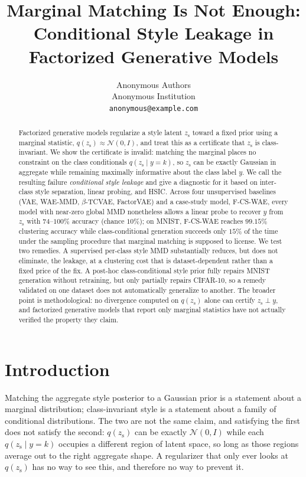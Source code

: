 \documentclass[10pt,letterpaper]{article}
\title{\vspace{-1.0em}
Marginal Matching Is Not Enough: \\
Conditional Style Leakage in Factorized Generative Models
\vspace{-0.3em}}
\author{
Anonymous Authors\\
\small Anonymous Institution\\
\small \texttt{anonymous@example.com}
}
\date{}
\newcommand{\ours}{F-CS-WAE}
\newcommand{\zs}{z_{\mathrm{s}}}
\begin{document}
\maketitle

\begin{abstract}
Factorized generative models regularize a style latent $\zs$ toward a fixed
prior using a marginal statistic, $q(\zs)\approx\mathcal N(0,I)$, and treat
this as a certificate that $\zs$ is class-invariant. We show the certificate
is invalid: matching the marginal places no constraint on the class
conditionals $q(\zs\mid y{=}k)$, so $\zs$ can be exactly Gaussian in
aggregate while remaining maximally informative about the class label $y$.
We call the resulting failure \emph{conditional style leakage} and give a
diagnostic for it based on inter-class style separation, linear probing, and
HSIC. Across four unsupervised baselines (VAE, WAE-MMD, $\beta$-TCVAE,
FactorVAE) and a case-study model, \ours{}, every model with near-zero
global MMD nonetheless allows a linear probe to recover $y$ from $\zs$ with
$74$--$100\%$ accuracy (chance $10\%$); on MNIST, \ours{} reaches $99.15\%$
clustering accuracy while class-conditional generation succeeds only $15\%$
of the time under the sampling procedure that marginal matching is supposed
to license. We test two remedies. A supervised per-class style MMD
substantially reduces, but does not eliminate, the leakage, at a clustering
cost that is dataset-dependent rather than a fixed price of the fix. A
post-hoc class-conditional style prior fully repairs MNIST generation
without retraining, but only partially repairs CIFAR-10, so a remedy
validated on one dataset does not automatically generalize to another. The
broader point is methodological: no divergence computed on $q(\zs)$ alone
can certify $\zs\perp y$, and factorized generative models that report only
marginal statistics have not actually verified the property they claim.
\end{abstract}

\section{Introduction}
\label{sec:intro}

Matching the aggregate style posterior to a Gaussian prior is a statement
about a marginal distribution; class-invariant style is a statement about a
family of conditional distributions. The two are not the same claim, and
satisfying the first does not satisfy the second: $q(\zs)$ can be exactly
$\mathcal N(0,I)$ while each $q(\zs\mid y{=}k)$ occupies a different region
of latent space, so long as those regions average out to the right
aggregate shape. A regularizer that only ever looks at $q(\zs)$ has no way
to see this, and therefore no way to prevent it.
\end{document}

